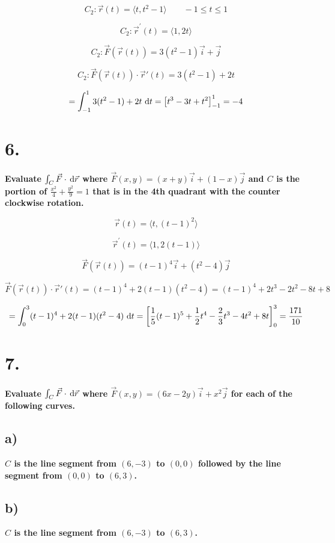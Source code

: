 \documentclass{scrartcl}
\DeclareRobustCommand*\d
{\ifmmode\mathop{}\!\mathrm{d}\else\expandafter\originald\fi}
\begin{document}
\[C_2: \vec{r}(t)= \langle t,t^2-1\rangle \qquad -1 \leq t \leq 1\]

\[C_2: \vec{r}^{\prime}(t)= \langle 1, 2t\rangle\]

\[C_2: \vec{F}(\vec{r}(t))= 3(t^2-1)\vec{i}+\vec{j}\]

\[C_2: \vec{F}(\vec{r}(t))\cdot \vec{r}{\prime}(t) = 3(t^2-1)+2t\]

\[=\int_{-1}^{1} 3(t^2-1)+2t \, \d t = \left[t^3-3t+t^2\right]_{-1}^{1}=-4\]

\section*{6.}

\textbf{Evaluate $\int_{C}^{} \vec{F} \cdot \, \d \vec{r}$ where $\vec{F}(x,y)=(x+y)\vec{i}+(1-x)\vec{j}$ and $C$ is the portion	of $\frac{x^2}{4}+\frac{y^2}{9}=1$ that is in the 4th quadrant with the counter clockwise rotation.}

\[\vec{r}(t)=\langle t,(t-1)^2\rangle\]

\[\vec{r}^{\prime}(t)=\langle 1,2(t-1)\rangle\]

\[\vec{F}(\vec{r}(t))= (t-1)^4\vec{i}+(t^2-4)\vec{j}\]

\[\vec{F}(\vec{r}(t))\cdot \vec{r}{\prime}(t) =(t-1)^4 + 2(t-1)(t^2-4)=(t-1)^4 + 2t^3-2t^2-8t+8\]

\[=\int_{0}^{3} (t-1)^4 + 2(t-1)(t^2-4) \, \d t =\left[\frac{1}{5}(t-1)^5 + \frac{1}{2}t^4-\frac{2}{3}t^3-4t^2+8t\right]_{0}^{3} = \frac{171}{10}\]


\section*{7.}

\textbf{Evaluate $\int_{C}^{} \vec{F} \cdot \, \d \vec{r}$ where $\vec{F}(x,y)=(6x-2y)\vec{i}+x^2\vec{j}$ for each of the following curves.}

\subsection*{a)}
\textbf{$C$ is the line segment from $(6,-3)$ to $(0,0)$ followed by the line segment from $(0,0)$ to $(6,3)$.}

\subsection*{b)}
\textbf{$C$ is the line segment from $(6,-3)$ to $(6,3)$.}
\end{document}
